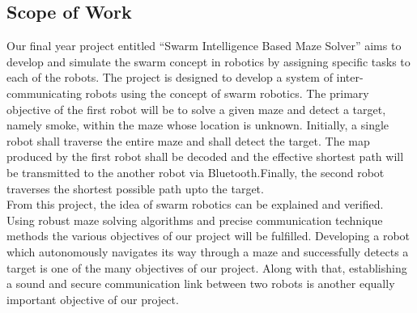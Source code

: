 \subsection{Scope of Work}
Our final year project entitled “Swarm Intelligence Based Maze Solver” aims to develop and simulate the swarm concept in robotics by assigning specific tasks to each of the robots. The project is designed to develop a system of inter-communicating robots using the concept of swarm robotics. The primary objective of the first robot will be to solve a given maze and detect a target, namely smoke, within the maze whose location is unknown. Initially,  a single robot shall traverse the entire maze and shall detect the target. The map produced by the first robot shall be decoded and the effective shortest path will be transmitted to the  another robot via Bluetooth.Finally, the second robot traverses the shortest possible path   upto the target.\\
From this project, the idea of swarm robotics can be explained and verified. Using robust maze solving algorithms and precise communication technique methods the various objectives of our project will be fulfilled. Developing a robot which autonomously navigates its way through a maze and successfully detects a target is one of the many objectives of our project. Along with that, establishing a sound and secure communication link between two robots is another equally important objective of our project.